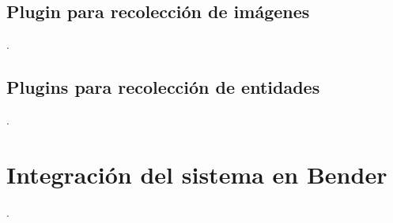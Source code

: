 \subsection{Plugin para recolección de imágenes}
.

\subsection{Plugins para recolección de entidades}
.


\section{Integración del sistema en Bender}

.
